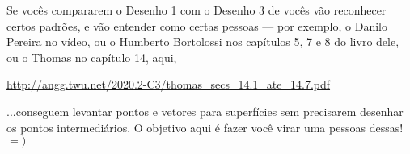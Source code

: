 \documentclass[oneside,12pt]{article}
\begin{document}
\newpage

Se vocês compararem o Desenho 1 com o Desenho 3 de vocês vão
reconhecer certos padrões, e vão entender como certas pessoas --- por
exemplo, o Danilo Pereira no vídeo, ou o Humberto Bortolossi nos
capítulos 5, 7 e 8 do livro dele, ou o Thomas no capítulo 14, aqui,

\ssk

{\footnotesize

\url{http://angg.twu.net/2020.2-C3/thomas_secs_14.1_ate_14.7.pdf}

}

\ssk

\noindent ...conseguem levantar pontos e vetores para superfícies sem
precisarem desenhar os pontos intermediários. O objetivo aqui é fazer
você virar uma pessoas dessas! $=)$





% 
% 
% 
% 
% 
% 
% 
% 
% 
% 
% 


% 
% 
% 






\end{document}
